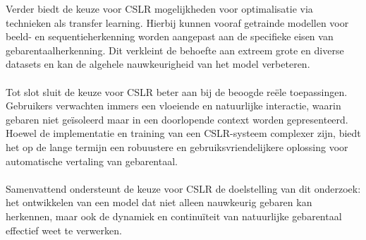 Verder biedt de keuze voor CSLR mogelijkheden voor optimalisatie via technieken als transfer learning. 
Hierbij kunnen vooraf getrainde modellen voor beeld- en sequentieherkenning worden aangepast aan de specifieke eisen van gebarentaalherkenning. 
Dit verkleint de behoefte aan extreem grote en diverse datasets en kan de algehele nauwkeurigheid van het model verbeteren.
\\
\\

Tot slot sluit de keuze voor CSLR beter aan bij de beoogde reële toepassingen. 
Gebruikers verwachten immers een vloeiende en natuurlijke interactie, waarin gebaren niet geïsoleerd maar in een doorlopende context worden gepresenteerd. 
Hoewel de implementatie en training van een CSLR-systeem complexer zijn, biedt het op de lange termijn een robuustere en gebruiksvriendelijkere oplossing voor automatische vertaling van gebarentaal.
\\
\\

Samenvattend ondersteunt de keuze voor CSLR de doelstelling van dit onderzoek: het ontwikkelen van een model dat niet alleen nauwkeurig gebaren kan herkennen, maar ook de dynamiek en continuïteit van natuurlijke gebarentaal effectief weet te verwerken.

